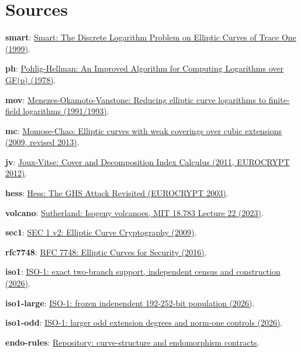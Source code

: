 \documentclass[10pt]{article}
\begin{document}
\section{Sources}
\textbf{smart}: \href{https://link.springer.com/article/10.1007/s001459900052}{Smart: The Discrete Logarithm Problem on Elliptic Curves of Trace One (1999)}.\par
{}\textbf{ph}: \href{https://ee.stanford.edu/~hellman/publications/28.pdf}{Pohlig-Hellman: An Improved Algorithm for Computing Logarithms over GF(p) (1978)}.\par
{}\textbf{mov}: \href{https://doi.org/10.1145/103418.103434}{Menezes-Okamoto-Vanstone: Reducing elliptic curve logarithms to finite-field logarithms (1991/1993)}.\par
{}\textbf{mc}: \href{https://eprint.iacr.org/2009/236}{Momose-Chao: Elliptic curves with weak coverings over cubic extensions (2009, revised 2013)}.\par
{}\textbf{jv}: \href{https://eprint.iacr.org/2011/020}{Joux-Vitse: Cover and Decomposition Index Calculus (2011, EUROCRYPT 2012)}.\par
{}\textbf{hess}: \href{https://www.iacr.org/archive/eurocrypt2003/26560374/26560374.pdf}{Hess: The GHS Attack Revisited (EUROCRYPT 2003)}.\par
{}\textbf{volcano}: \href{https://math.mit.edu/classes/18.783/2023/LectureNotes22.pdf}{Sutherland: Isogeny volcanoes, MIT 18.783 Lecture 22 (2023)}.\par
{}\textbf{sec1}: \href{https://www.secg.org/sec1-v2.pdf}{SEC 1 v2: Elliptic Curve Cryptography (2009)}.\par
{}\textbf{rfc7748}: \href{https://www.rfc-editor.org/rfc/rfc7748}{RFC 7748: Elliptic Curves for Security (2016)}.\par
{}\textbf{iso1}: \href{https://github.com/aburan28/crypto/blob/codex/iso1-report-final-20261008/research/iso1_weak_classes_20261007/two_branch_20261009/REPORT.md}{ISO-1: exact two-branch support, independent census and construction (2026)}.\par
{}\textbf{iso1-large}: \href{https://github.com/aburan28/crypto/blob/codex/iso1-report-final-20261008/research/iso1_weak_classes_20261007/large_population_20261009/REPORT.md}{ISO-1: frozen independent 192-252-bit population (2026)}.\par
{}\textbf{iso1-odd}: \href{https://github.com/aburan28/crypto/blob/codex/iso1-report-final-20261008/research/iso1_weak_classes_20261007/larger_fields_20261009/REPORT.md}{ISO-1: larger odd extension degrees and norm-one controls (2026)}.\par
{}\textbf{endo-rules}: \href{https://github.com/aburan28/crypto/blob/codex/iso1-report-final-20261008/docs/endomorphism-rules.md}{Repository: curve-structure and endomorphism contracts}.\par
\end{document}
